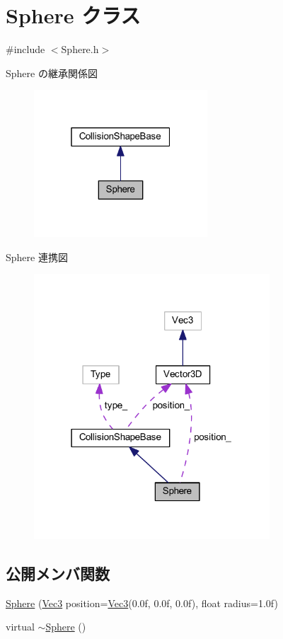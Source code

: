 \hypertarget{class_sphere}{}\section{Sphere クラス}
\label{class_sphere}


{\ttfamily \#include $<$Sphere.\+h$>$}



Sphere の継承関係図\nopagebreak
\begin{figure}[H]
\begin{center}
\leavevmode
\includegraphics[width=184pt]{class_sphere__inherit__graph}
\end{center}
\end{figure}


Sphere 連携図\nopagebreak
\begin{figure}[H]
\begin{center}
\leavevmode
\includegraphics[width=250pt]{class_sphere__coll__graph}
\end{center}
\end{figure}
\subsection*{公開メンバ関数}
\begin{DoxyCompactItemize}
\item 
\mbox{\hyperlink{class_sphere_a00281a2ff42b3f2668fb853890447a73}{Sphere}} (\mbox{\hyperlink{_vector3_d_8h_ab16f59e4393f29a01ec8b9bbbabbe65d}{Vec3}} position=\mbox{\hyperlink{_vector3_d_8h_ab16f59e4393f29a01ec8b9bbbabbe65d}{Vec3}}(0.\+0f, 0.\+0f, 0.\+0f), float radius=1.\+0f)
\item 
virtual \mbox{\hyperlink{class_sphere_a569c071e50a3e11f678630ee1a17737e}{$\sim$\+Sphere}} ()
\end{DoxyCompactItemize}
